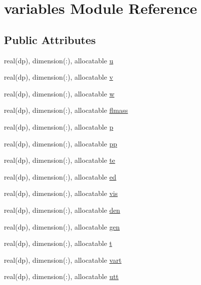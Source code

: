 \hypertarget{classvariables}{\section{variables Module Reference}
\label{classvariables}
}
\subsection*{Public Attributes}
\begin{DoxyCompactItemize}
\item 
real(dp), dimension(\-:), allocatable \hyperlink{classvariables_a8dc91b5653cabcfd17192c04c5c90d57}{u}
\item 
real(dp), dimension(\-:), allocatable \hyperlink{classvariables_a86b6b89bf878f32443ca5fec75e65ad3}{v}
\item 
real(dp), dimension(\-:), allocatable \hyperlink{classvariables_a3432b41828f50801593af70692df12f2}{w}
\item 
real(dp), dimension(\-:), allocatable \hyperlink{classvariables_a785014a6b534cef9da96697952e877ea}{flmass}
\item 
real(dp), dimension(\-:), allocatable \hyperlink{classvariables_a8751a3abd1938c8541b57c00a742ec56}{p}
\item 
real(dp), dimension(\-:), allocatable \hyperlink{classvariables_a25e1a833edf25885416779bdf0a8b7e7}{pp}
\item 
real(dp), dimension(\-:), allocatable \hyperlink{classvariables_a6a12c6b89bcd378447b44ba71d496bb5}{te}
\item 
real(dp), dimension(\-:), allocatable \hyperlink{classvariables_aad1b3731d203da8923cd7e6a879d586b}{ed}
\item 
real(dp), dimension(\-:), allocatable \hyperlink{classvariables_ac469ba5672674935b4d3faa619ea51e5}{vis}
\item 
real(dp), dimension(\-:), allocatable \hyperlink{classvariables_aebe58d45baf0e70b27271513dfdb2829}{den}
\item 
real(dp), dimension(\-:), allocatable \hyperlink{classvariables_a7fba6e5562a27808947cabbcbf416a37}{gen}
\item 
real(dp), dimension(\-:), allocatable \hyperlink{classvariables_a29c960024498876d106d12750eae8696}{t}
\item 
real(dp), dimension(\-:), allocatable \hyperlink{classvariables_a00a6536ca0a27051d610b66a2d8d11ac}{vart}
\item 
real(dp), dimension(\-:), allocatable \hyperlink{classvariables_a808a247289d7b02f9569e57fa6df3c2b}{utt}

\end{DoxyCompactItemize}
